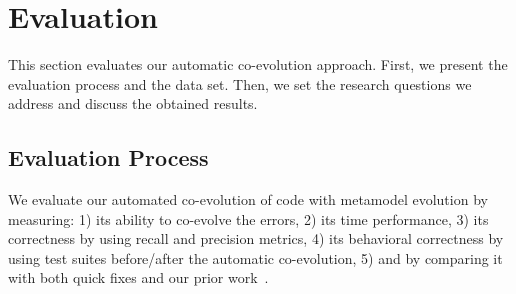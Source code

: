 




\section{Evaluation}\label{eval}

This section evaluates our automatic co-evolution approach. 
First, we present the evaluation process and the data set. Then, we set the research questions we address and discuss the obtained results.


\subsection{Evaluation Process}

We evaluate our automated co-evolution of code with metamodel evolution by measuring: 1) its ability to co-evolve the errors, 2) its time performance, 3) its correctness by using recall and precision metrics, 4) its behavioral correctness by using test suites before/after the automatic co-evolution, 5) and by comparing it with both quick fixes and our prior work~\cite{Khelladi2020}. %

